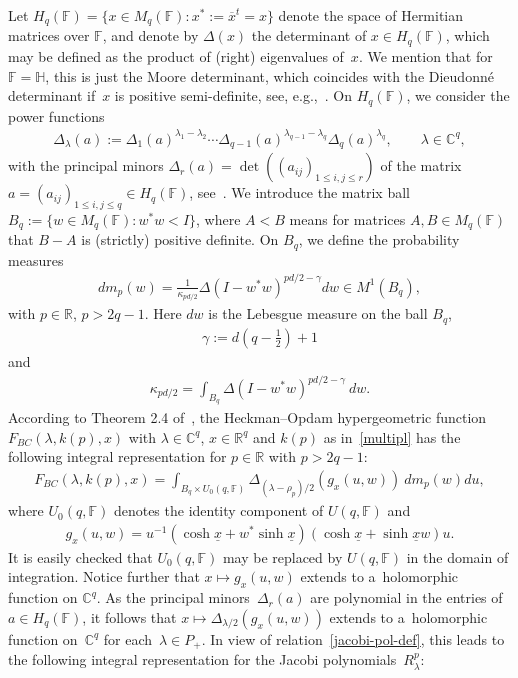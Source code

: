 Let $H_q(\mathbb F)=\{x\in M_q(\mathbb F): x^*:= \overline x^t=x\}$ denote the space of Hermitian matrices over
$\mathbb F$, and denote by $\Delta(x)$ the determinant of $x\in H_q(\mathbb F)$, which may be def\/ined as the product of
(right) eigenvalues of~$x$.
We mention that for $\mathbb F=\mathbb H$, this is just the Moore determinant, which coincides with the Dieudonn\'e
determinant if~$x$ is positive semi-def\/inite, see, e.g.,~\cite{A}.
On $H_q(\mathbb F)$, we consider the power functions
\begin{gather*}
\Delta_\lambda(a):= \Delta_1(a)^{\lambda_1-\lambda_2}   \cdots   \Delta_{q-1}(a)^{\lambda_{q-1}-\lambda_q} \Delta_q(a)^{\lambda_{q}},
\qquad
\lambda \in \mathbb C^q,
\end{gather*}
with the principal minors $\Delta_r(a)=\det ((a_{ij})_{1\leq i,j\leq r}) $ of the matrix $a=(a_{ij})_{1\leq i,j\leq
q}\in H_q(\mathbb F)$, see~\cite{FK}.
We introduce the matrix ball $ B_q:= \{w\in M_q(\mathbb F): w^*w < I\}$, where $A<B$ means for matrices $A,B\in
M_q(\mathbb F)$ that $B-A$ is (strictly) positive def\/inite.
On $B_q$, we def\/ine the probability measures
\begin{gather*}
dm_p(w)=\frac{1}{\kappa_{pd/2}} \Delta(I-w^*w)^{pd/2-\gamma}dw
\in M^1(B_q),
\end{gather*}
with $p\in \mathbb R$, $p>2q-1$.
Here $dw$ is the Lebesgue measure on the ball $B_q$,
\begin{gather*}
\gamma:= d\left(q-\frac{1}{2}\right)+1
\end{gather*}
and
\begin{gather*}
\kappa_{pd/2}= \int_{B_q} \Delta(I-w^*w)^{pd/2-\gamma}\> dw.
\end{gather*}
According to Theorem 2.4 of~\cite{RV2}, the Heckman--Opdam hypergeometric function $F_{BC}(\lambda, k(p),x)$ with
$\lambda \in \mathbb C^q$, $x\in \mathbb R^q$ and $k(p)$ as in~\eqref{multipl} has the following integral representation
for $p\in \mathbb R$ with $p>2q-1$:
\begin{gather*}
F_{BC}(\lambda, k(p), x)=\int_{B_q\times U_0(q, \mathbb F)} \Delta_{(\lambda-\rho_p)/2}(g_x(u,w))\> dm_p(w)du,
\end{gather*}
where $U_0(q,\mathbb F)$ denotes the identity component of $U(q, \mathbb F)$ and
\begin{gather*}
g_x(u,w)=u^{-1}(\cosh \underline x+w^* \sinh \underline x)(\cosh \underline x+\sinh\underline x w)u.
\end{gather*}
It is easily checked that $U_0(q, \mathbb F)$ may be replaced by $U(q,\mathbb F)$ in the domain of integration.
Notice further that $x\mapsto g_x(u,w)$ extends to a~holomorphic function on $\mathbb C^q$.
As the principal minors~$\Delta_r(a)$ are polynomial in the entries of $a\in H_q(\mathbb F)$, it follows
that $x\mapsto\Delta_{\lambda/2}(g_x(u,w))$ extends to a~holomorphic function on~$\mathbb C^q$ for each~$\lambda \in P_+$.
In view of relation~\eqref{jacobi-pol-def}, this leads to the following integral representation for the Jacobi
polynomials~$R_\lambda^p$:

